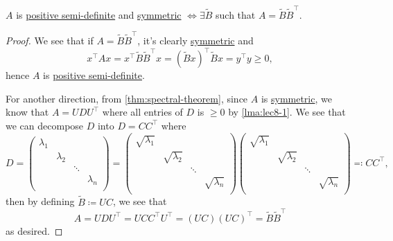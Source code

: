 \begin{lemma}\label{lma:lec8-2}
	\(A\) is \hyperref[def:positive-semi-definite]{positive semi-definite} and \hyperref[def:symmetric-matrix]{symmetric} \(\iff \exists \widetilde{B}\) such that \(A = \widetilde{B} \widetilde{B} ^{\top}\).
\end{lemma}
\begin{proof}
	We see that if \(A = \widetilde{B} \widetilde{B} ^{\top} \), it's clearly \hyperref[def:symmetric-matrix]{symmetric} and
	\[
		x^{\top} A x = x^{\top} \widetilde{B} \widetilde{B} ^{\top} x = (\widetilde{B} x)^{\top} \widetilde{B} x = y^{\top} y \geq 0,
	\]
	hence \(A\) is \hyperref[def:positive-semi-definite]{positive semi-definite}.

	For another direction, from \autoref{thm:spectral-theorem}, since \(A\) is \hyperref[def:symmetric-matrix]{symmetric}, we know that \(A = U D U^{\top}\) where all entries of \(D\) is \(\geq 0\) by \autoref{lma:lec8-1}. We see that we can decompose \(D\) into \(D = C C^{\top} \) where
	\[
		D = \begin{pmatrix}
			\lambda_1 &           &        &           \\
			          & \lambda_2 &        &           \\
			          &           & \ddots &           \\
			          &           &        & \lambda_n \\
		\end{pmatrix} = \begin{pmatrix}
			\sqrt{\lambda_1} &                  &        &                  \\
			                 & \sqrt{\lambda_2} &        &                  \\
			                 &                  & \ddots &                  \\
			                 &                  &        & \sqrt{\lambda_n} \\
		\end{pmatrix} \begin{pmatrix}
			\sqrt{\lambda_1} &                  &        &                  \\
			                 & \sqrt{\lambda_2} &        &                  \\
			                 &                  & \ddots &                  \\
			                 &                  &        & \sqrt{\lambda_n} \\
		\end{pmatrix} \eqqcolon C C^{\top},
	\]
	then by defining \(\widetilde{B} \coloneqq UC\), we see that
	\[
		A = U D U^{\top} = U C C^{\top} U^{\top} = (UC) (UC)^{\top} = \widetilde{B} \widetilde{B} ^{\top}
	\]
	as desired.
\end{proof}

